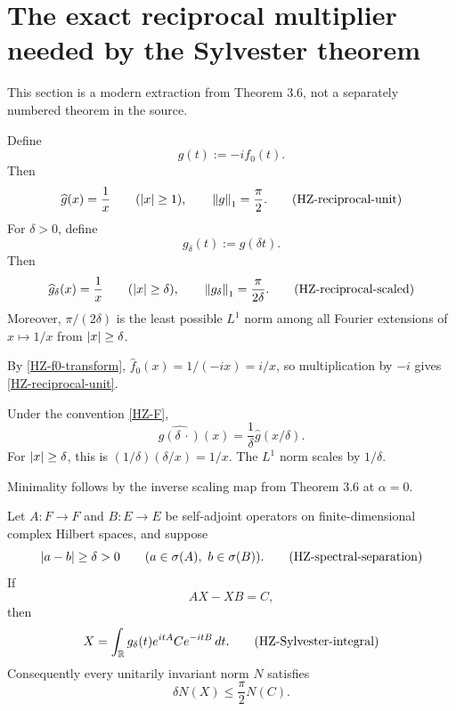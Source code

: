 \section{The exact reciprocal multiplier needed by the Sylvester theorem}

This section is a modern extraction from Theorem 3.6, not a separately numbered theorem in the source.

\begin{corollary}
Define
\[
  g(t):=-i f_0(t).
  \tag{HZ-g0}\label{HZ-g0}
\]
Then
\[
  \widehat g(x)=\frac1x\qquad(|x|\ge1),
  \qquad
  \left\lVert g\right\rVert_1=\frac\pi2.
  \tag{HZ-reciprocal-unit}\label{HZ-reciprocal-unit}
\]
For $\delta>0$, define
\[
  g_\delta(t):=g(\delta t).
  \tag{HZ-scale-density}\label{HZ-scale-density}
\]
Then
\[
  \widehat g_\delta(x)=\frac1x
  \qquad(\left\lvert x\right\rvert\ge\delta),
  \qquad
  \left\lVert g_\delta\right\rVert_1=\frac\pi{2\delta}.
  \tag{HZ-reciprocal-scaled}\label{HZ-reciprocal-scaled}
\]
Moreover, $\pi/(2\delta)$ is the least possible $L^1$ norm among all Fourier extensions of $x\mapsto1/x$ from $\left\lvert x\right\rvert\ge\delta$.
\end{corollary}

\begin{argument}
\item By \eqref{HZ-f0-transform}, $\widehat f_0(x)=1/(-ix)=i/x$, so multiplication by $-i$ gives \eqref{HZ-reciprocal-unit}.
\item Under the convention \eqref{HZ-F},
\[
  \widehat{g(\delta\,\cdot)}(x)
  =\frac1\delta\widehat g(x/\delta).
  \tag{HZ-scale-FT}\label{HZ-scale-FT}
\]
For $\left\lvert x\right\rvert\ge\delta$, this is $(1/\delta)(\delta/x)=1/x$. The $L^1$ norm scales by $1/\delta$.
\item Minimality follows by the inverse scaling map from Theorem 3.6 at $\alpha=0$.
\end{argument}

\begin{corollary}
Let $A:F\to F$ and $B:E\to E$ be self-adjoint operators on finite-dimensional complex Hilbert spaces, and suppose
\[
  \left\lvert a-b\right\rvert\ge\delta>0
  \qquad(a\in\sigma(A),\ b\in\sigma(B)).
  \tag{HZ-spectral-separation}\label{HZ-spectral-separation}
\]
If
\[
  AX-XB=C,
  \tag{HZ-Sylvester}\label{HZ-Sylvester}
\]
then
\[
  X=\int_{\mathbb{R}}g_\delta(t)e^{itA}Ce^{-itB}\,dt.
  \tag{HZ-Sylvester-integral}\label{HZ-Sylvester-integral}
\]
Consequently every unitarily invariant norm $N$ satisfies
\[
  \delta N(X)\le\frac\pi2N(C).
  \tag{HZ-Sylvester-bound}\label{HZ-Sylvester-bound}
\]
\end{corollary}

